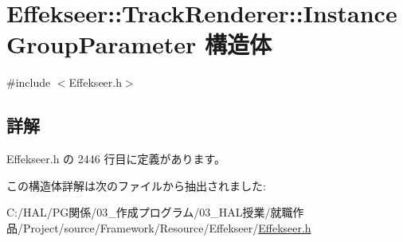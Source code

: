 \hypertarget{struct_effekseer_1_1_track_renderer_1_1_instance_group_parameter}{}\section{Effekseer\+:\+:Track\+Renderer\+:\+:Instance\+Group\+Parameter 構造体}
\label{struct_effekseer_1_1_track_renderer_1_1_instance_group_parameter}


{\ttfamily \#include $<$Effekseer.\+h$>$}



\subsection{詳解}


 Effekseer.\+h の 2446 行目に定義があります。



この構造体詳解は次のファイルから抽出されました\+:\begin{DoxyCompactItemize}
\item 
C\+:/\+H\+A\+L/\+P\+G関係/03\+\_\+作成プログラム/03\+\_\+\+H\+A\+L授業/就職作品/\+Project/source/\+Framework/\+Resource/\+Effekseer/\mbox{\hyperlink{_effekseer_8h}{Effekseer.\+h}}\end{DoxyCompactItemize}
